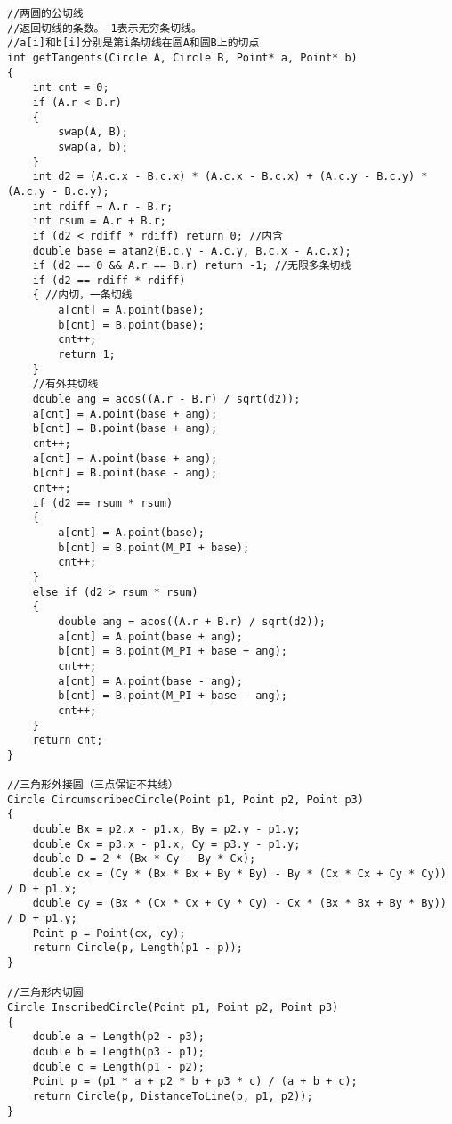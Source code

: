 \documentclass[twoside]{article}
\begin{document}
\begin{lstlisting}
//两圆的公切线
//返回切线的条数。-1表示无穷条切线。
//a[i]和b[i]分别是第i条切线在圆A和圆B上的切点
int getTangents(Circle A, Circle B, Point* a, Point* b)
{
    int cnt = 0;
    if (A.r < B.r)
    {
        swap(A, B);
        swap(a, b);
    }
    int d2 = (A.c.x - B.c.x) * (A.c.x - B.c.x) + (A.c.y - B.c.y) * (A.c.y - B.c.y);
    int rdiff = A.r - B.r;
    int rsum = A.r + B.r;
    if (d2 < rdiff * rdiff) return 0; //内含
    double base = atan2(B.c.y - A.c.y, B.c.x - A.c.x);
    if (d2 == 0 && A.r == B.r) return -1; //无限多条切线
    if (d2 == rdiff * rdiff)
    { //内切，一条切线
        a[cnt] = A.point(base);
        b[cnt] = B.point(base);
        cnt++;
        return 1;
    }
    //有外共切线
    double ang = acos((A.r - B.r) / sqrt(d2));
    a[cnt] = A.point(base + ang);
    b[cnt] = B.point(base + ang);
    cnt++;
    a[cnt] = A.point(base + ang);
    b[cnt] = B.point(base - ang);
    cnt++;
    if (d2 == rsum * rsum)
    {
        a[cnt] = A.point(base);
        b[cnt] = B.point(M_PI + base);
        cnt++;
    }
    else if (d2 > rsum * rsum)
    {
        double ang = acos((A.r + B.r) / sqrt(d2));
        a[cnt] = A.point(base + ang);
        b[cnt] = B.point(M_PI + base + ang);
        cnt++;
        a[cnt] = A.point(base - ang);
        b[cnt] = B.point(M_PI + base - ang);
        cnt++;
    }
    return cnt;
}

//三角形外接圆（三点保证不共线）
Circle CircumscribedCircle(Point p1, Point p2, Point p3)
{
    double Bx = p2.x - p1.x, By = p2.y - p1.y;
    double Cx = p3.x - p1.x, Cy = p3.y - p1.y;
    double D = 2 * (Bx * Cy - By * Cx);
    double cx = (Cy * (Bx * Bx + By * By) - By * (Cx * Cx + Cy * Cy)) / D + p1.x;
    double cy = (Bx * (Cx * Cx + Cy * Cy) - Cx * (Bx * Bx + By * By)) / D + p1.y;
    Point p = Point(cx, cy);
    return Circle(p, Length(p1 - p));
}

//三角形内切圆
Circle InscribedCircle(Point p1, Point p2, Point p3)
{
    double a = Length(p2 - p3);
    double b = Length(p3 - p1);
    double c = Length(p1 - p2);
    Point p = (p1 * a + p2 * b + p3 * c) / (a + b + c);
    return Circle(p, DistanceToLine(p, p1, p2));
}
\end{lstlisting}
\end{document}
